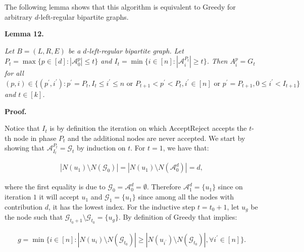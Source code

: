 The following lemma shows that this algorithm is equivalent to Greedy for arbitrary $d$-left-regular bipartite graphs.\par





\par\medskip\noindent\textbf{\textbf{Lemma 12}\textbf{.}}\par



\emph{Let $B=(L,R,E)$ be a $d$-left-regular bipartite graph.
Let $P_{t}=\max\{p\in[d]:|\mathcal{A}^{p}_{0}|\leq t\}$
and $I_{t}=\min\{i\in[n]:|\mathcal{A}^{P_{t}}_{i}|\geq t\}$.
Then $A^{p}_{i}=G_{t}$ for all $(p,i)\in\{(p^{\prime},i^{\prime}):p^{\prime}=P_{t},I_{t}\leq i^{\prime}\leq n\text{ or }P_{t+1}<p^{\prime}<P_{t},i^{\prime}\in[n]\text{ or }p^{\prime}=P_{t+1},0\leq i^{\prime}<I_{t+1}\}$ and $t\in[k]$.}\par






\par\medskip\noindent\textbf{Proof.}\par



Notice that $I_{t}$ is by definition the iteration on which AcceptReject accepts the $t$-th node in phase $P_{t}$ and the additional nodes are never accepted.
We start by showing that $\mathcal{A}^{P_{t}}_{I_{t}}=\mathcal{G}_{t}$ by induction on $t$.
For $t=1$, we have that:\par


\[\begin{gathered}
\displaystyle|N(u_{1})\setminus N(\mathcal{G}_{0})|=|N(u_{1})\setminus N(\mathcal{A}^{d}_{0})|=d,
\end{gathered}\]


where the first equality is due to $\mathcal{G}_{0}=\mathcal{A}^{d}_{0}=\emptyset$.
Therefore $\mathcal{A}^{d}_{1}=\{u_{1}\}$ since on iteration $1$ it will accept $u_{1}$ and $\mathcal{G}_{1}=\{u_{1}\}$ since among all the nodes with contribution $d$, it has the lowest index.
For the inductive step $t=t_{0}+1$, let $u_{g}$ be the node such that $\mathcal{G}_{t_{0}+1}\setminus\mathcal{G}_{t_{0}}=\{u_{g}\}$.
By definition of Greedy that implies:\par


\[\begin{gathered}
\displaystyle g=\min\{i\in[n]:|N(u_{i})\setminus N(\mathcal{G}_{t_{0}})|\geq|N(u_{i^{\prime}})\setminus N(\mathcal{G}_{t_{0}})|,\forall i^{\prime}\in[n]\}.
\end{gathered}\]


